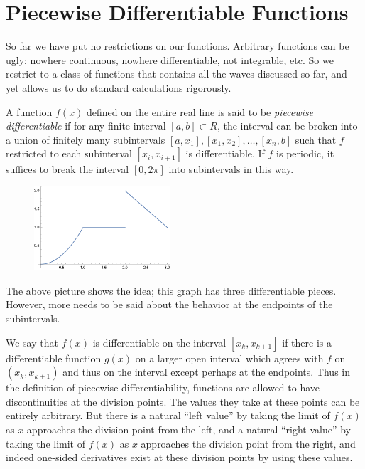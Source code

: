 \documentclass[11pt, oneside]{amsart}
\begin{document}
\section{Piecewise Differentiable Functions}

So far we have put no restrictions on our functions. Arbitrary functions can be ugly: nowhere continuous, nowhere differentiable, not integrable, etc. So we restrict to a class of functions that contains all the waves discussed so far, and yet allows us to do standard calculations rigorously.

A function $f(x)$ defined on the entire real line is said to be {\em piecewise differentiable} if for any finite interval $[a, b] \subset R$, the interval  can be broken into a union of finitely many subintervals $[a, x_1], [x_1, x_2], \ldots, [x_n, b]$ such that $f$ restricted to each subinterval $[x_i, x_{i + 1}]$ is differentiable. If $f$ is periodic,  it suffices to break the interval $[0, 2 \pi]$ into subintervals in this way. 

\begin{figure}[htbp] %
   \centering
   \includegraphics[width=2in]{Graphics/jumps}
\end{figure}

The above picture shows the idea; this graph has three differentiable pieces. However, more needs to be said about the behavior at the endpoints of the subintervals.

We say that $f(x)$ is differentiable on the interval $[x_k, x_{k + 1}]$ if there is a differentiable function $g(x)$ on a larger open interval which agrees with $f$ on $(x_k, x_{k + 1})$ and thus on the interval except perhaps at the endpoints. Thus in the definition of piecewise differentiability, functions are allowed to have discontinuities at the division points. The values they take at these points can be entirely arbitrary. But there is a natural ``left value'' by taking the limit of 
$f(x)$ as $x$ approaches the division point from the left, and a natural ``right value'' by taking the limit of $f(x)$ as $x$ approaches the division point from the right, and indeed one-sided derivatives exist at these division points by using these values. 
\end{document}
